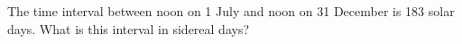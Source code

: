 The time interval between noon on 1 July and noon on 31 December is 183 solar
days. What is this interval in sidereal days?
